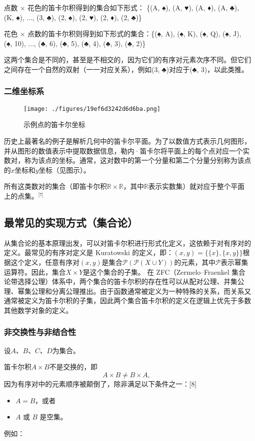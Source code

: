 点数 × 花色的笛卡尔积得到的集合如下形式：  
\{(A, ♠), (A, ♥), (A, ♦), (A, ♣), (K, ♠), \(\ldots\), (3, ♣), (2, ♠), (2, ♥), (2, ♦), (2, ♣)\}

花色 × 点数的笛卡尔积则得到如下形式的集合：\{(♠, A), (♠, K), (♠, Q), (♠, J), (♠, 10), \(\ldots\), (♣, 6), (♣, 5), (♣, 4), (♣, 3), (♣, 2)\}

这两个集合是不同的，甚至是不相交的，因为它们的有序对元素次序不同。但它们之间存在一个自然的双射（一一对应关系），例如(3, ♣)对应于(♣, 3)，以此类推。
\subsubsection{二维坐标系}
\begin{figure}[ht]
\centering
\texttt{[image: ./figures/19ef6d3242d6d6ba.png]}
\caption{示例点的笛卡尔坐标} \label{fig_DKR_2}
\end{figure}
历史上最著名的例子是解析几何中的笛卡尔平面。为了以数值方式表示几何图形，并从图形的数值表示中提取数据信息，勒内·笛卡尔将平面上的每个点对应一个实数对，称为该点的坐标。通常，这对数中的第一个分量和第二个分量分别称为该点的\(x\)坐标和\(y\)坐标（见图示）。

所有这类数对的集合（即笛卡尔积\( \mathbb{R} \times \mathbb{R} \)，其中\( \mathbb{R} \)表示实数集）就对应于整个平面上的点集。\(^\text{[7]}\)
\subsection{最常见的实现方式（集合论）}  
从集合论的基本原理出发，可以对笛卡尔积进行形式化定义，这依赖于对有序对的定义。最常见的有序对定义是 Kuratowski 的定义，即：\((x, y) = \{\{x\}, \{x, y\}\}\)根据这个定义，任意有序对\( (x, y) \)是集合\(\mathcal{P}(\mathcal{P}(X \cup Y))\)的元素，其中\( \mathcal{P} \)表示幂集运算符。因此，集合\( X \times Y \)是这个集合的子集。
在 ZFC（Zermelo–Fraenkel 集合论带选择公理）体系中，两个集合的笛卡尔积的存在性可以从配对公理、并集公理、幂集公理和分离公理推出。由于函数通常被定义为一种特殊的关系，而关系又通常被定义为笛卡尔积的子集，因此两个集合笛卡尔积的定义在逻辑上优先于多数其他数学对象的定义。
\subsubsection{非交换性与非结合性} 
设\( A \)、\( B \)、\( C \)、\( D \)为集合。

笛卡尔积\( A \times B \)不是交换的，即  
\[
A \times B \ne B \times A,~
\]  
因为有序对中的元素顺序被颠倒了，除非满足以下条件之一：[8]
\begin{itemize}
\item \( A = B \)，或者  
\item \( A \) 或 \( B \) 是空集。
\end{itemize}
例如：

